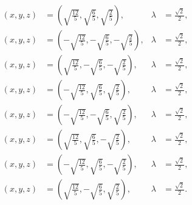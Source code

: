 \documentclass[13pt]{memoir}
\begin{document}
\begin{enumerate}
\begin{align*}
(x, y, z) &= \left( \sqrt{\frac{12}{5}}, \sqrt{\frac{6}{5}}, \sqrt{\frac{2}{5}} \right), & \lambda &= \frac{\sqrt{2}}{2}, \\
(x, y, z) &= \left( -\sqrt{\frac{12}{5}}, -\sqrt{\frac{6}{5}}, -\sqrt{\frac{2}{5}} \right), & \lambda &= \frac{\sqrt{2}}{2}, \\
(x, y, z) &= \left( \sqrt{\frac{12}{5}}, -\sqrt{\frac{6}{5}}, -\sqrt{\frac{2}{5}} \right), & \lambda &= \frac{\sqrt{2}}{2}, \\
(x, y, z) &= \left( -\sqrt{\frac{12}{5}}, \sqrt{\frac{6}{5}}, \sqrt{\frac{2}{5}} \right), & \lambda &= \frac{\sqrt{2}}{2}, \\
(x, y, z) &= \left( -\sqrt{\frac{12}{5}}, -\sqrt{\frac{6}{5}}, \sqrt{\frac{2}{5}} \right), & \lambda &= \frac{\sqrt{2}}{2}, \\
(x, y, z) &= \left( \sqrt{\frac{12}{5}}, \sqrt{\frac{6}{5}}, -\sqrt{\frac{2}{5}} \right), & \lambda &= \frac{\sqrt{2}}{2}, \\
(x, y, z) &= \left( -\sqrt{\frac{12}{5}}, \sqrt{\frac{6}{5}}, -\sqrt{\frac{2}{5}} \right), & \lambda &= \frac{\sqrt{2}}{2}, \\
(x, y, z) &= \left( \sqrt{\frac{12}{5}}, -\sqrt{\frac{6}{5}}, \sqrt{\frac{2}{5}} \right), & \lambda &= \frac{\sqrt{2}}{2}.
\end{align*}



\end{enumerate}	
\end{document}
